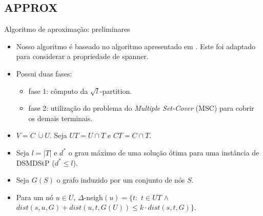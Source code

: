 \documentclass[10pt]{beamer}
\begin{document}
\subsection{APPROX}

\begin{frame}{Algoritmo de aproximação: preliminares}
  \begin{itemize}
    \item <1-> Nosso algoritmo é baseado no algoritmo apresentado em \cite{Elkin2006}. Este foi adaptado para considerar a propriedade de spanner.
    \item <2-> Possui duas fases:
    \begin{itemize}
      \item <3-> fase 1: cômputo da $\sqrt{l}$-partition.
      \item <4-> fase 2: utilização do problema do \emph{Multiple Set-Cover} (MSC) para cobrir os demais terminais.
    \end{itemize}
    \item <5-> $V = C \ \dot \cup U$. Seja $UT = U \cap T$ e $CT = C \cap T$.
    \item <6-> Seja $l = |T|$ e $d^*$ o grau máximo de uma solução ótima para uma instância de DSMDStP ($d^* \leq l$).
    \item <7-> Seja $G(S)$ o grafo induzido por um conjunto de nós $S$.
    \item <8-> Para um nó $u \in U$, $\Delta$-neigh$(u) = \{ t :$ $t \in UT$ $\land$ $dist(s,u,G) + dist(u,t,G(U)) \leq k \cdot dist(s,t,G) \}$.
  \end{itemize}
\end{frame}
\end{document}
